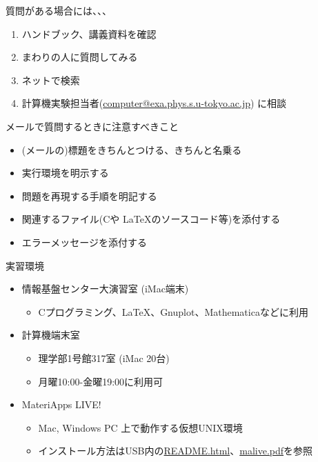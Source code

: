 \documentclass[dvipdfmx]{beamer}
\begin{document}
\begin{frame}[t]{質問がある場合には、、、}
  \begin{enumerate}
  \item ハンドブック、講義資料を確認
  \item まわりの人に質問してみる
  \item ネットで検索
  \item 計算機実験担当者(\href{mailto:computer@exa.phys.s.u-tokyo.ac.jp}{computer@exa.phys.s.u-tokyo.ac.jp}) に相談
  \end{enumerate}
  メールで質問するときに注意すべきこと
  \begin{itemize}
  \item (メールの)標題をきちんとつける、きちんと名乗る
  \item 実行環境を明示する
  \item 問題を再現する手順を明記する
  \item 関連するファイル(Cや \LaTeX のソースコード等)を添付する
  \item エラーメッセージを添付する
  \end{itemize}
\end{frame}

\begin{frame}[t,fragile]{実習環境}
  \begin{itemize}
    \setlength{\itemsep}{1em}
  \item 情報基盤センター大演習室 (iMac端末)
    \begin{itemize}
    \item Cプログラミング、\LaTeX、Gnuplot、Mathematicaなどに利用
    \end{itemize}
  \item 計算機端末室
    \begin{itemize}
    \item 理学部1号館317室 (iMac 20台)
    \item 月曜10:00-金曜19:00に利用可
    \end{itemize}
  \item MateriApps LIVE!
    \begin{itemize}
    \item Mac, Windows PC 上で動作する仮想UNIX環境
    \item インストール方法はUSB内の\href{https://github.com/cmsi/MateriAppsLive/wiki/MateriAppsLive-ltx}{README.html}、\href{http://www.slideshare.net/cms_initiative/materiapps-live-52477264}{malive.pdf}を参照
    \end{itemize}
  \end{itemize}
\end{frame}
\end{document}
